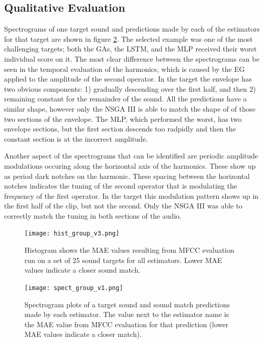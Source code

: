 \subsection{Qualitative Evaluation}
Spectrograms of one target sound and predictions made by each of the estimators for that target are shown in figure \ref{fig:group_spect}. The selected example was one of the most challenging targets; both the GAs, the LSTM, and the MLP received their worst individual score on it. The most clear difference between the spectrograms can be seen in the temporal evaluation of the harmonics, which is caused by the EG applied to the amplitude of the second operator. In the target the envelope has two obvious components: 1) gradually descending over the first half, and then 2) remaining constant for the remainder of the sound. All the predictions have a similar shape, however only the NSGA III is able to match the shape of of those two sections of the envelope. The MLP, which performed the worst, has two envelope sections, but the first section descends too radpidly and then the constant section is at the incorrect amplitude.

Another aspect of the spectrograms that can be identified are periodic amplitude modulations occuring along the horizontal axis of the harmonics. These show up as period dark notches on the harmonic. These spacing between the horizontal notches indicates the tuning of the second operator that is modulating the frequency of the first operator. In the target this modulation pattern shows up in the first half of the clip, but not the second. Only the NSGA III was able to correctly match the tuning in both sections of the audio. 


\begin{figure}[t]
\begin{center}
\texttt{[image: hist\_group\_v3.png]}
\caption{Histogram shows the MAE values resulting from MFCC evaluation run on a set of 25 sound targets for all estimators. Lower MAE values indicate a closer sound match.}
\label{fig:group_hist}
\end{center}
\end{figure}

\begin{figure}[t]
\begin{center}
\texttt{[image: spect\_group\_v1.png]}
\caption{Spectrogram plots of a target sound and sound match predictions made by each estimator. The value next to the estimator name is the MAE value from MFCC evaluation for that prediction (lower MAE values indicate a closer match).}
\label{fig:group_spect}
\end{center}
\end{figure}

